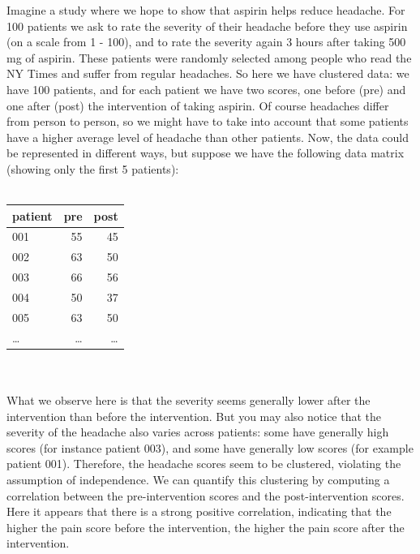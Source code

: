 \documentclass[]{report}\usepackage[]{graphicx}\usepackage[]{color}
\begin{document}
Imagine a study where we hope to show that aspirin helps reduce headache. For 100 patients we ask to rate the severity of their headache before they use aspirin (on a scale from 1 - 100), and to rate the severity again 3 hours after taking 500 mg of aspirin. These patients were randomly selected among people who read the NY Times and suffer from regular headaches. So here we have clustered data: we have 100 patients, and for each patient we have two scores, one before (pre) and one after (post) the intervention of taking aspirin. Of course headaches differ from person to person, so we might have to take into account that some patients have a higher average level of headache than other patients. Now, the data could be represented in different ways, but suppose we have the following data matrix (showing only the first 5 patients):
 \\
 \\
 \begin{tabular}{lrr}
 patient & pre & post \\ \hline
 001 & 55 & 45 \\
 002 & 63 & 50 \\
 003 & 66 & 56 \\
 004 & 50 & 37 \\
 005 & 63 & 50 \\
 \dots & \dots & \dots \\
 \end{tabular}
\\
\\
What we observe here is that the severity seems generally lower after the intervention than before the intervention. But you may also notice that the severity of the headache also varies across patients: some have generally high scores (for instance patient 003), and some have generally low scores (for example patient 001). Therefore, the headache scores seem to be clustered, violating the assumption of independence. We can quantify this clustering by computing a correlation between the pre-intervention scores and the post-intervention scores. Here it appears that there is a strong positive correlation, indicating that the higher the pain score before the intervention, the higher the pain score after the intervention. 
\\
\\
\end{document}
